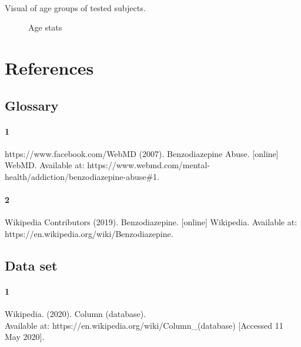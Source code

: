 \documentclass{article}
\begin{document}
    \paragraph{}
    Visual of age groups of tested subjects.
    \begin{figure}[!htb]
        \caption{\label{fig:age-general-view} Age stats}
    \end{figure}
    \newpage




    \section{References}
    \subsection{Glossary}
    \paragraph{1}
    https://www.facebook.com/WebMD (2007). Benzodiazepine Abuse. [online] WebMD. Available at: https://www.webmd.com/mental-health/addiction/benzodiazepine-abuse\#1.
    \paragraph{2}
    Wikipedia Contributors (2019). Benzodiazepine. [online] Wikipedia. Available at: https://en.wikipedia.org/wiki/Benzodiazepine.
    \subsection{Data set}
    \paragraph{1}
    Wikipedia. (2020). Column (database). \\
    [online] Available at: https://en.wikipedia.org/wiki/Column\_(database) [Accessed 11 May 2020].
\end{document}
